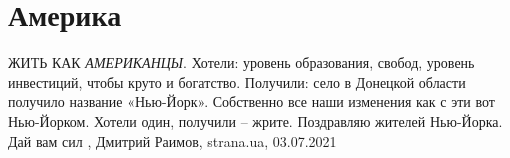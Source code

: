  
 
 
 
 
\chapter{Америка}

ЖИТЬ КАК \emph{АМЕРИКАНЦЫ}. Хотели: уровень образования, свобод, уровень
инвестиций, чтобы круто и богатство.  Получили: село в Донецкой области
получило название «Нью-Йорк».  Собственно все наши изменения как с эти вот
Нью-Йорком. Хотели один, получили – жрите.  Поздравляю жителей Нью-Йорка. Дай
вам сил
,
Дмитрий Раимов, strana.ua, 03.07.2021

